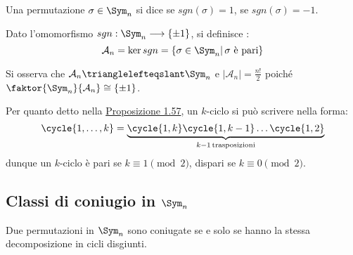\documentclass[11pt]{scrartcl}
\begin{document}
\begin{definition}
    Una permutazione $\sigma \in \Sym_n$ si dice  se $sgn(\sigma) = 1$,  se $sgn(\sigma) = -1$.
\end{definition}

\begin{definition}
    Dato l'omomorfismo $sgn : \Sym_n \longrightarrow \{\pm 1\}$, si definisce :
        \[ \mathcal{A}_n = \ker sgn = \{\sigma \in \Sym_n |\, \text{$\sigma$ è pari}\}
            \]
\end{definition}

\begin{remark}
    Si osserva che $\mathcal{A}_n \trianglelefteqslant \Sym_n$ e $\displaystyle|\mathcal{A}_n| = \frac{n!}{2}$ poiché $\faktor{\Sym_n}{\mathcal{A}_n} \cong \{\pm 1\}$.
\end{remark}

\begin{remark}
    Per quanto detto nella \hyperref[trasp]{Proposizione 1.57}, un $k$-ciclo si può scrivere nella forma:
        \[ \cycle{1,\ldots,k} = \underbrace{\cycle{1,k}\cycle{1,k-1}\ldots\cycle{1,2}}_{k-1 \, \text{trasposizioni}}
            \]
    dunque un $k$-ciclo è pari se $k \equiv 1 \pmod 2$, dispari se $k \equiv 0 \pmod 2$.
\end{remark}

\pagebreak

\subsection{Classi di coniugio in $\Sym_n$}
\begin{theorem}
    Due permutazioni in $\Sym_n$ sono coniugate se e solo se hanno la stessa decomposizione in cicli disgiunti.
\end{theorem}
\end{document}
